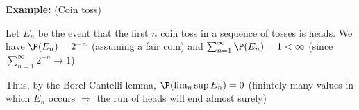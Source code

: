 \par\bigskip
\noindent\textbf{Example:} (Coin toss)\par
\noindent Let $E_n$ be the event that the first $n$ coin toss in a sequence of tosses is heads. We have $\P(E_n) = 2^{-n}$ (assuming a fair coin) and $\sum_{n=1}^{\infty}\P(E_n) = 1<\infty$ (since $\sum_{n=1}^{\infty}2^{-n}\to1$)\par
\noindent Thus, by the Borel-Cantelli lemma, $\P(\lim_{n}\sup E_n) = 0$ (finintely many values in which $E_n$ occurs $\Rightarrow$ the run of heads will end almost surely)
